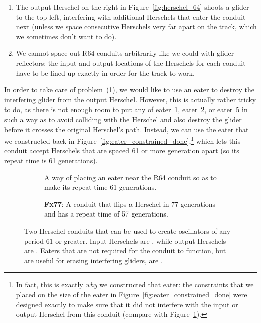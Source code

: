 \begin{enumerate}
	\item[1)] The output Herschel on the right in Figure~\ref{fig:herschel_64} shoots a glider to the top-left, interfering with additional Herschels that enter the conduit next (unless we space consecutive Herschels very far apart on the track, which we sometimes don't want to do).\smallskip
	
	\item[2)] We cannot space out R64 conduits arbitrarily like we could with glider reflectors: the input and output locations of the Herschels for each conduit have to be lined up exactly in order for the track to work.\medskip
\end{enumerate}

In order to take care of problem~(1), we would like to use an eater to destroy the interfering glider from the output Herschel. However, this is actually rather tricky to do, as there is not enough room to put any of eater~1, eater~2, or eater~5 in such a way as to avoid colliding with the Herschel and also destroy the glider before it crosses the original Herschel's path. Instead, we can use the eater that we constructed back in Figure~\ref{fig:eater_constrained_done},\footnote{In fact, this is exactly \emph{why} we constructed that eater: the constraints that we placed on the size of the eater in Figure~\ref{fig:eater_constrained_done} were designed exactly to make sure that it did not interfere with the input or output Herschel from this conduit (compare with Figure~\ref{fig:R64}).} which lets this conduit accept Herschels that are spaced 61 or more generation apart (so its repeat time is 61 generations).

\begin{figure}[!htb]
	\centering
	\begin{subfigure}{.48\textwidth}
		\centering
		\caption{A way of placing an eater near the R64 conduit so as to make its repeat time 61 generations.}
		\label{fig:R64}
	\end{subfigure} \hfill %
	\begin{subfigure}{.48\textwidth}
		\centering
		\caption{\textbf{Fx77}: A conduit that flips a Herschel in 77 generations and has a repeat time of 57 generations.}
		\label{fig:Fx77}
	\end{subfigure}
	\caption{Two Herschel conduits that can be used to create oscillators of any period $61$ or greater. Input Herschels are , while output Herschels are . Eaters that are not required for the conduit to function, but are useful for erasing interfering gliders, are .}
	\label{fig:herschel_conduits}
\end{figure}

